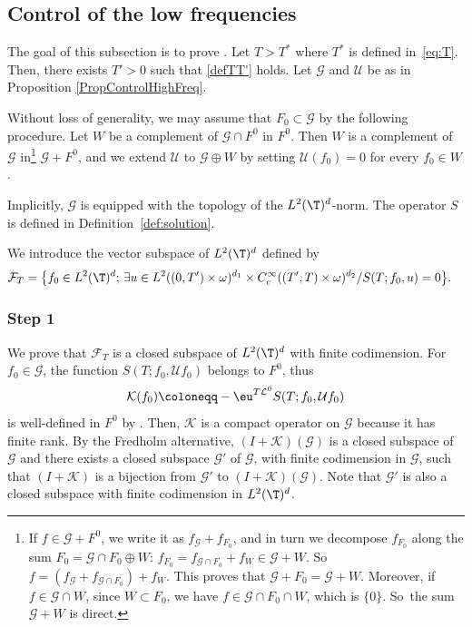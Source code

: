 \subsection{Control of the low frequencies}
\label{ControlLowFreqSec}

The goal of this subsection is to prove .
Let $T > T^{*}$ where $T^{*}$ is defined in~\eqref{eq:T}. Then, there exists $T'>0$ such that \eqref{defTT'} holds. Let $\mathcal{G}$ and $\mathcal{U}$ be as in Proposition \ref{PropControlHighFreq}.

Without loss of generality, we may assume that $F_0\subset \mathcal G$ by the following procedure. Let $W$ be a complement of $\mathcal G\cap F^0$ in $F^0$. Then $W$ is a complement of $\mathcal G$ in\footnote{If $f\in \mathcal G+F^0$, we write it as $f_{\mathcal G} + f_{F_0}$, and in turn we decompose $f_{F_0}$ along the sum $F_0 =\mathcal G\cap F_0\oplus W$: $f_{F_0} = f_{\mathcal G\cap F_0}+f_W\in \mathcal G+W$. So $f = (f_{\mathcal G} + f_{ \mathcal G \cap F_0}) + f_{W}$. This proves that $\mathcal G+F_0 = \mathcal G+W$. Moreover, if $f\in \mathcal G\cap W$, since $W\subset F_0$, we have $f\in \mathcal G\cap F_0\cap W$, which is $\{0\}$. So~the sum $\mathcal G+W$ is direct.} $\mathcal G+F^0$, and we extend $\mathcal U$ to $\mathcal G\oplus W$ by setting $\mathcal U(f_0) = 0$ for every $f_0\in W$.

Implicitly, $\mathcal{G}$ is equipped with the topology of the $L^2(\T)^d$-norm. The operator $S$ is defined in Definition~\ref{def:solution}.

We introduce the vector subspace of $L^2(\T)^d$ defined by
\begin{align*}
\mathcal{F}_{T} = \big\{ f_0 \in L^2(\T)^{d} ;\ & \exists u \in L^2((0,T')\times\omega)^{d_1} \times C^\infty_c ((T',T)\times\omega)^{d_2} / S(T;f_0, u)=0
\big\}.
\end{align*}

\subsubsection*{Step 1}
We prove that $\mathcal{F}_{T}$ is a closed subspace of $L^2(\T)^d$ with finite codimension. For $f_0 \in \mathcal{G}$,
the function $S(T;f_0,\mathcal{U}f_0)$ belongs to $F^0$,
thus\vspace*{-2pt}
\begin{equation} \label{def:Kf00}
\mathcal{K}(f_0)\coloneqq -\eu^{T \mathcal{L}^0} S(T;f_0,\mathcal{U}f_0)
\end{equation}
is well-defined in $F^0$ by . Then, $\mathcal{K}$ is a compact operator on $\mathcal{G}$ because it has finite rank.
By the Fredholm alternative,
$(I+\mathcal{K})(\mathcal{G})$ is a closed subspace of $\mathcal{G}$ and
there exists a closed subspace $\mathcal{G}'$ of $\mathcal{G}$, with finite codimension in $\mathcal{G}$, such that $(I+\mathcal{K})$ is a bijection from $\mathcal{G}'$ to $(I+\mathcal{K})(\mathcal{G})$.
Note that $\mathcal{G}'$ is also a closed subspace with finite codimension in $L^2(\T)^d$.

